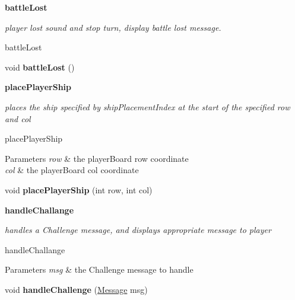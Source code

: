 \begin{Indent}{\bf battle\+Lost}\par
{\em player lost sound and stop turn, display battle lost message.

battle\+Lost }\begin{DoxyCompactItemize}
\item 
\hypertarget{classbattleship_1_1game_1_1Player_abb6e94a9bcbeb569e3d98af7466280a7}{}void {\bfseries battle\+Lost} ()\label{classbattleship_1_1game_1_1Player_abb6e94a9bcbeb569e3d98af7466280a7}

\end{DoxyCompactItemize}
\end{Indent}
\begin{Indent}{\bf place\+Player\+Ship}\par
{\em places the ship specified by ship\+Placement\+Index at the start of the specified row and col

place\+Player\+Ship


\begin{DoxyParams}{Parameters}
{\em row} & the player\+Board row coordinate \\
\hline
{\em col} & the player\+Board col coordinate \\
\hline
\end{DoxyParams}
}\begin{DoxyCompactItemize}
\item 
\hypertarget{classbattleship_1_1game_1_1Player_ac0b492b971ccc934f29c413a259ee7c6}{}void {\bfseries place\+Player\+Ship} (int row, int col)\label{classbattleship_1_1game_1_1Player_ac0b492b971ccc934f29c413a259ee7c6}

\end{DoxyCompactItemize}
\end{Indent}
\begin{Indent}{\bf handle\+Challange}\par
{\em handles a Challenge message, and displays appropriate message to player

handle\+Challange


\begin{DoxyParams}{Parameters}
{\em msg} & the Challenge message to handle \\
\hline
\end{DoxyParams}
}\begin{DoxyCompactItemize}
\item 
\hypertarget{classbattleship_1_1game_1_1Player_a06398a4cdbd6283502865830fbe60499}{}void {\bfseries handle\+Challenge} (\hyperlink{classbattleship_1_1game_1_1Message}{Message} msg)\label{classbattleship_1_1game_1_1Player_a06398a4cdbd6283502865830fbe60499}

\end{DoxyCompactItemize}
\end{Indent}
